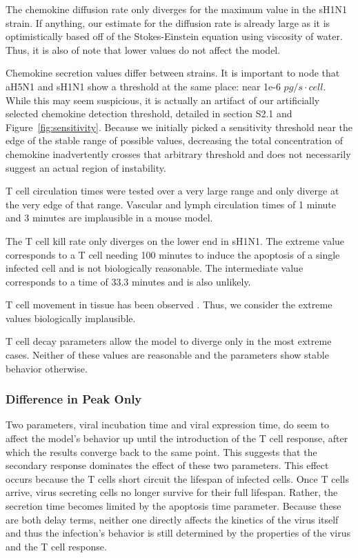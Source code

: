 \documentclass[10pt]{article}
\begin{document}
The chemokine diffusion rate only diverges for the maximum value in the sH1N1 strain.  If anything, our estimate for the diffusion rate is already large as it is optimistically based off of the Stokes-Einstein equation using viscosity of water.  Thus, it is also of note that lower values do not affect the model.

Chemokine secretion values differ between strains.  It is important to node that aH5N1 and sH1N1 show a threshold at the same place: near 1e-6 $pg/s\cdot cell$.  While this may seem suspicious, it is actually an artifact of our artificially selected chemokine detection threshold, detailed in section S2.1 and Figure~\ref{fig:sensitivity}.  Because we initially picked a sensitivity threshold near the edge of the stable range of possible values, decreasing the total concentration of chemokine inadvertently crosses that arbitrary threshold and does not necessarily suggest an actual region of instability.

T cell circulation times were tested over a very large range and only diverge at the very edge of that range.  Vascular and lymph circulation times of 1 minute and 3 minutes are implausible in a mouse model.

The T cell kill rate only diverges on the lower end in sH1N1.  The extreme value corresponds to a T cell needing 100 minutes to induce the apoptosis of a single infected cell and is not biologically reasonable.  The intermediate value corresponds to a time of 33.3 minutes and is also unlikely.

T cell movement in tissue has been observed \cite{Egen2011}.  Thus, we consider the extreme values biologically implausible.

T cell decay parameters allow the model to diverge only in the most extreme cases.  Neither of these values are reasonable and the parameters show stable behavior otherwise.

\subsubsection*{Difference in Peak Only}

Two parameters, viral incubation time and viral expression time, do seem to affect the model's behavior up until the introduction of the T cell response, after which the results converge back to the same point.  This suggests that the secondary response dominates the effect of these two parameters.  This effect occurs because the T cells short circuit the lifespan of infected cells.  Once T cells arrive, virus secreting cells no longer survive for their full lifespan.  Rather, the secretion time becomes limited by the apoptosis time parameter.  Because these are both delay terms, neither one directly affects the kinetics of the virus itself and thus the infection's behavior is still determined by the properties of the virus and the T cell response.
\end{document}
